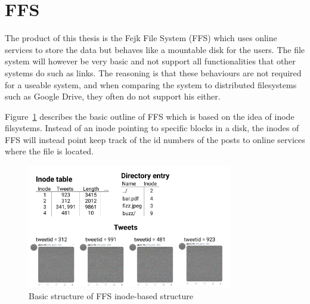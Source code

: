 \section{FFS}
The product of this thesis is the Fejk File System (FFS) which uses online services to store the data but behaves like a mountable disk for the users. The file system will however be very basic and not support all functionalities that other systems do such as links. The reasoning is that these behaviours are not required for a useable system, and when comparing the system to distributed filesystems such as Google Drive, they often do not support his either.

Figure~\ref{fig:ffs_inode_diag} describes the basic outline of FFS which is based on the idea of inode filsystems. Instead of an inode pointing to specific blocks in a disk, the inodes of FFS will instead point keep track of the id numbers of the posts to online services where the file is located. 

\begin{figure}[!ht]
	\begin{center}
	  \includegraphics[width=0.8\textwidth]{figures/ffs_inode_diagram.png}
	\end{center}
	\caption{Basic structure of FFS inode-based structure}
	\label{fig:ffs_inode_diag}
\end{figure}

